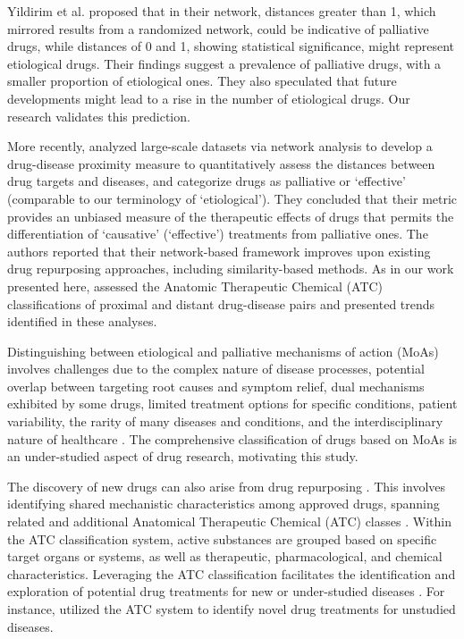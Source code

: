\documentclass[journal,twoside,web]{ieeecolor}
\begin{document}
Yildirim et al. \cite{yildirim2007drug} proposed that in their network, distances greater than 1, which mirrored results from a randomized network, could be indicative of palliative drugs, while distances of 0 and 1, showing statistical significance, might represent etiological drugs.
Their findings suggest a prevalence of palliative drugs, with a smaller proportion of etiological ones.
They also speculated \cite{yildirim2007drug} that future developments might lead to a rise in the number of etiological drugs.
Our research validates this prediction.

More recently, \cite{guney2016network} analyzed large-scale datasets via network analysis to develop a drug-disease proximity measure to quantitatively assess the distances between drug targets and diseases, and categorize drugs as palliative or `effective' (comparable to our terminology of `etiological'). 
They concluded that their metric provides an unbiased measure of the therapeutic effects of drugs that permits the differentiation of `causative' (`effective') treatments from palliative ones. 
The authors reported that their network-based framework improves upon existing drug repurposing approaches, including similarity-based methods. 
As in our work presented here, \cite{guney2016network} assessed the Anatomic Therapeutic Chemical (ATC) classifications of proximal and distant drug-disease pairs and presented trends identified in these analyses.

Distinguishing between etiological and palliative mechanisms of action (MoAs) involves challenges due to the complex nature of disease processes, potential overlap between targeting root causes and symptom relief, dual mechanisms exhibited by some drugs, limited treatment options for specific conditions, patient variability, the rarity of many diseases and conditions, and the interdisciplinary nature of healthcare \cite{yu2020exploring}.
The comprehensive classification of drugs based on MoAs is an under-studied aspect of drug research, motivating this study.

The discovery of new drugs can also arise from drug repurposing \cite{parvathaneni2019drug}.
This involves identifying shared mechanistic characteristics among approved drugs, spanning related and additional Anatomical Therapeutic Chemical (ATC) classes \cite{xue2018review}.
Within the ATC classification system, active substances are grouped based on specific target organs or systems, as well as therapeutic, pharmacological, and chemical characteristics.
Leveraging the ATC classification facilitates the identification and exploration of potential drug treatments for new or under-studied diseases \cite{yang2017literature}.
For instance, \cite{olson2017predicting} utilized the ATC system to identify novel drug treatments for unstudied diseases.
\end{document}
